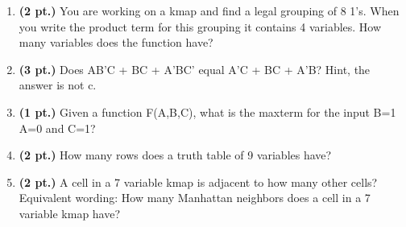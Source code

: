 \documentclass{article}
\begin{document}
\begin{enumerate}
\item {\bf (2 pt.)} You are working on a kmap and find a legal grouping 
of 8 1's.  When you write the product term for this grouping it contains 4
variables.  How many variables does the function have?

\pagebreak
\item {\bf (3 pt.)} Does AB'C + BC + A'BC' equal A'C + BC + A'B?
Hint, the answer is not c.

\item {\bf (1 pt.)} Given a function F(A,B,C), what is the maxterm
for the input B=1 A=0 and C=1?

\item {\bf (2 pt.)} How many rows does a truth table of 9 variables have?

\item {\bf (2 pt.)} A cell in a 7 variable kmap is adjacent to how many 
other cells?  Equivalent wording: How many Manhattan neighbors does a 
cell in a 7 variable kmap have?


\end{enumerate}
\end{document}
